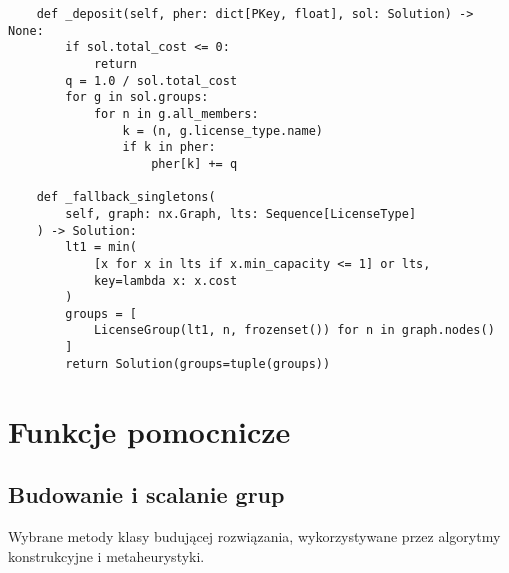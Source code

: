 \begin{verbatim}
    def _deposit(self, pher: dict[PKey, float], sol: Solution) -> None:
        if sol.total_cost <= 0:
            return
        q = 1.0 / sol.total_cost
        for g in sol.groups:
            for n in g.all_members:
                k = (n, g.license_type.name)
                if k in pher:
                    pher[k] += q

    def _fallback_singletons(
        self, graph: nx.Graph, lts: Sequence[LicenseType]
    ) -> Solution:
        lt1 = min(
            [x for x in lts if x.min_capacity <= 1] or lts,
            key=lambda x: x.cost
        )
        groups = [
            LicenseGroup(lt1, n, frozenset()) for n in graph.nodes()
        ]
        return Solution(groups=tuple(groups))
\end{verbatim}

\section{Funkcje pomocnicze}
\subsection{Budowanie i scalanie grup}
Wybrane metody klasy budującej rozwiązania, wykorzystywane przez
algorytmy konstrukcyjne i metaheurystyki.

